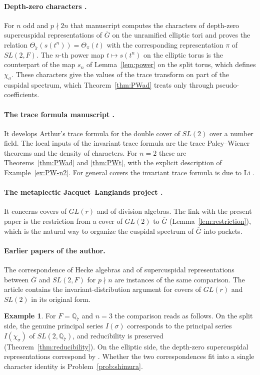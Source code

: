 \documentclass[12pt,letterpaper]{article}
\numberwithin{equation}{section}
\theoremstyle{definition}
\newtheorem{example}[theorem]{Example}
\newcommand{\Q}{\mathbb Q}
\newcommand{\bG}{\overline{G}}
\begin{document}
\paragraph{Depth-zero characters \cite{JoCh}.}  For $n$ odd and $p\nmid2n$ that manuscript
computes the characters of depth-zero supercuspidal representations of $\bG$ on the
unramified elliptic tori and proves the relation
$\Theta_{\tilde\pi}(s(t^n))=\Theta_\pi(t)$ with the corresponding representation $\pi$ of
$SL(2,F)$.  The $n$-th power map $t\mapsto s(t^n)$ on the elliptic torus is the counterpart
of the map $s_n$ of Lemma~\ref{lem:power} on the split torus, which defines $\chi_\sigma$.
These characters give the values of the trace transform on part of the cuspidal
spectrum, which Theorem~\ref{thm:PWad} treats only through pseudo-coefficients.

\paragraph{The trace formula manuscript \cite{JoTr}.}  It develops Arthur's trace formula
for the double cover of $SL(2)$ over a number field.  The local inputs of the invariant
trace formula are the trace Paley--Wiener theorems and the density of characters.  For
$n=2$ these are Theorems~\ref{thm:PWad} and \ref{thm:PWt}, with the explicit description of
Example~\ref{ex:PW-n2}.  For general covers the invariant trace formula is due to Li
\cite{Li14}.

\paragraph{The metaplectic Jacquet--Langlands project \cite{JoMJL}.}  It concerns covers
of $GL(r)$ and of division algebras.  The link with the present paper is the restriction
from a cover of $GL(2)$ to $\bG$ (Lemma~\ref{lem:restriction}), which is the natural way
to organize the cuspidal spectrum of $\bG$ into packets.

\paragraph{Earlier papers of the author.}  The correspondence of Hecke algebras
\cite{Jo98} and of supercuspidal representations \cite{Jo99} between $\bG$ and $SL(2,F)$
for $p\nmid n$ are instances of the same comparison.  The article \cite{Jo01} contains
the invariant-distribution argument for covers of $GL(r)$ and $SL(2)$ in its original
form.

\begin{example}\label{ex:connections}
For $F=\Q_7$ and $n=3$ the comparison reads as follows.  On the split side, the genuine
principal series $I(\sigma)$ corresponds to the principal series $I(\chi_\sigma)$ of
$SL(2,\Q_7)$, and reducibility is preserved (Theorem~\ref{thm:reducibility}).  On the
elliptic side, the depth-zero supercuspidal representations correspond by \cite{JoCh}.
Whether the two correspondences fit into a single character identity is
Problem~\ref{prob:shimura}.
\end{example}
\end{document}
